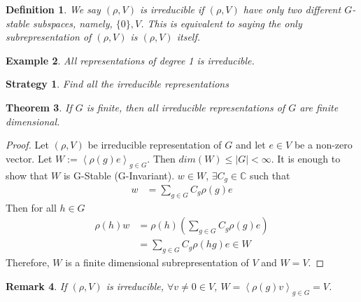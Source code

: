\documentclass[letterpaper, leqno, 12pt]{article}
\newcommand{\fin}{\qquad \quad \hfill \framebox[1.75mm][l]{\,}}
\providecommand{\abs}[1]{\left\lvert#1\right\rvert}
\providecommand{\ip}[1]{\left\langle #1 \right\rangle}
\newcommand{\bC} {\mathbb{C}}
\newcommand {\repV} {(\rho,V)}
\theoremstyle{stdthm}
\newtheorem{thm}{Theorem}
\theoremstyle{stddef}
\newtheorem{defn}[thm]{Definition}
\newtheorem{rem}[thm]{Remark} %
\newtheorem{eg}[thm]{Example} %
\theoremstyle{stdnonum}
\theoremstyle{stdqands}
\theoremstyle{stdbold}
\newtheorem{strat}{Strategy}
\begin{document}
\begin{defn}
We say $(\rho, V)$ is irreducible if $(\rho,V)$ have only two different $G$-stable subspaces, namely, $\{0\},V$. This is equivalent to saying the only subrepresentation of $(\rho,V)$ is $(\rho,V)$ itself. 
\end{defn}

\begin{eg}
All representations of degree 1 is irreducible. 
\end{eg}

\begin{strat}
Find all the irreducible representations
\end{strat}

\begin{thm}
If $G$ is finite, then all irreducible representations of $G$ are finite dimensional. 
\end{thm}

\begin{proof}
Let $\repV$ be irreducible representation of $G$ and let $e\in V$ be a non-zero vector. Let $W := \ip{\rho(g)e}_{g\in G}$. Then $dim(W) \leq \abs{G} <\infty$. It is enough to show that $W$ is G-Stable (G-Invariant). $w\in W$, $\exists C_g \in \bC$ such that 
\begin{align*}
w &= \sum_{g\in G} C_g \rho(g) e
\end{align*}
Then for all $h\in G$
\begin{align*}
\rho(h)w &= \rho(h) \left( \sum_{g\in G} C_g \rho(g) e \right)\\
&= \sum_{g\in G} C_g \rho(hg)e \in W
\end{align*}
Therefore, $W$ is a finite dimensional subrepresentation of $V$ and $W=V$. 
\end{proof}

\begin{rem}
If $(\rho,V)$ is irreducible, $\forall v \neq 0 \in V$, $W = \ip{\rho(g)v}_{g\in G} = V$. 
\end{rem}
\end{document}
